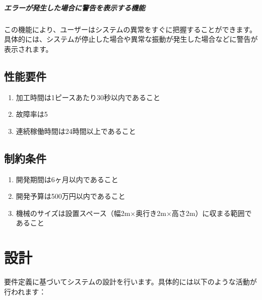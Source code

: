 \paragraph{エラーが発生した場合に警告を表示する機能}
この機能により、ユーザーはシステムの異常をすぐに把握することができます。具体的には、システムが停止した場合や異常な振動が発生した場合などに警告が表示されます。



\section{性能要件}
\begin{enumerate}
\item 加工時間は1ピースあたり30秒以内であること
\item 故障率は5%
\item 連続稼働時間は24時間以上であること
\end{enumerate}



\section{制約条件}
\begin{enumerate}
\item 開発期間は6ヶ月以内であること
\item 開発予算は500万円以内であること
\item 機械のサイズは設置スペース（幅2m×奥行き2m×高さ2m）に収まる範囲であること
\end{enumerate}




\chapter{設計}
要件定義に基づいてシステムの設計を行います。具体的には以下のような活動が行われます：




